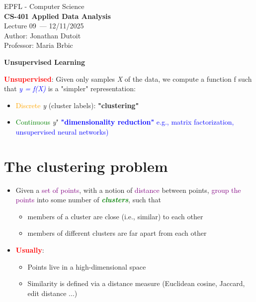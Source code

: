 \documentclass[11pt]{article}
\newcommand{\coursename}{CS-401 Applied Data Analysis}
\newcommand{\lecturenum}{09}
\newcommand{\lecturedate}{12/11/2025}
\newcommand{\professor}{Maria Brbic}
\begin{document}
\begin{center}
  {\large EPFL - Computer Science} \\[0.5em]
  {\Large \textbf{\coursename}} \\[0.5em]
  {\large Lecture \lecturenum\ --- \lecturedate} \\[0.5em]
  {\large Author: Jonathan Dutoit} \\[0.5em]
  {\large Professor: \professor} \\[0.5em]
\end{center}

\vspace{2cm}

\begin{center}
  {\LARGE \textbf{Unsupervised Learning}}
\end{center}

\vspace{1cm}

\textbf{\textcolor{red}{Unsupervised}}: Given only samples \textit{X} of the data, we compute a function f such that \textcolor{blue}{\textit{y = f(X)}} is a "simpler" representation:
\begin{itemize}
	\item \textcolor{orange}{Discrete} \textit{y} (cluster labels): \textbf{"clustering"}
	\item \textcolor{green}{Continuous} \textit{y}" \textbf{\textcolor{blue}{"dimensionality reduction"}} \textcolor{blue}{e.g., matrix factorization, unsupervised neural networks)}
\end{itemize}

\section*{The clustering problem}

\begin{itemize}
	\item Given a \textcolor{purple}{set of points}, with a notion of \textcolor{purple}{distance} between points, \textcolor{purple}{group the points} into some number of \textit{\textbf{\textcolor{green}{clusters}}}, such that 
		\begin{itemize}
			\item members of a cluster are close (i.e., similar) to each other
			\item members of different clusters are far apart from each other
		\end{itemize}
	\item \textbf{\textcolor{red}{Usually}}:
		\begin{itemize}
			\item Points live in a high-dimensional space
			\item Similarity is defined via a distance measure (Euclidean cosine, Jaccard, edit distance ...)
		\end{itemize}
\end{itemize}
\end{document}
